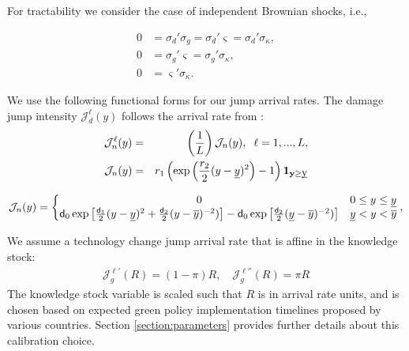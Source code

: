 \documentclass[12pt]{article}
\begin{document}
For tractability we consider the case of independent Brownian shocks, i.e.,

\begin{align*}
0 & =\sigma_{d}'\sigma_{g}=\sigma_{d}'\varsigma=\sigma_{d}'\sigma_{\kappa},\\
0 & =\sigma_{g}'\varsigma=\sigma_{g}'\sigma_{\kappa},\\
0 & =\varsigma'\sigma_{\kappa}.
\end{align*}

We use the following functional forms for our jump arrival rates. The damage jump intensity $\mathcal{J}^{\ell}_d(y)$ follows the arrival rate from \cite{BarnettBrockHansenZhang:2023}:
\begin{eqnarray*}
{\mathcal J}_n^\ell(y) & = & \left(\frac 1 {L}\right) {\mathcal J}_n(y), \hspace{.2cm} \ell=1,...,L, \\
{\mathcal J}_n (y) & = & { r}_1 \left( \exp\left( \frac {{ r}_2} 2 (y - {\underline y})^2 \right) - 1\right) \bf 1_{ y \ge {\underbar y}}
\end{eqnarray*}

{\color{red}
\[
{\mathcal J}_n(y)  =  \left\{ \begin{matrix} 0 & 0 \le y \le {\underline y} \cr {\sf d}_0 \exp\left[ \frac {{\sf d}_1} 2 (y - {\underline y})^2 + \frac {{\sf d}_2} 2  (y - 
{\overline y})^{-2})\right] - 
{\sf d}_0 \exp\left[ \frac {{\sf d}_2} 2  ({\underline y} - 
{\overline y})^{-2})\right]
&  {\underline y} < y < {\overline y} \end{matrix} \right.,
\]
}

We assume a  technology change jump arrival rate that is affine in the knowledge stock: 
\begin{eqnarray*}
    \mathcal{J}^{\ell'}_g(R) = (1-\pi) R, \quad \mathcal{J}^{\ell''}_g(R) = \pi R
\end{eqnarray*} 
The knowledge stock variable is scaled such that $R$ is in arrival rate units, and is chosen based on expected green policy implementation timelines proposed by various countries. Section \ref{section:parameters} provides further details about this calibration choice.
\end{document}
